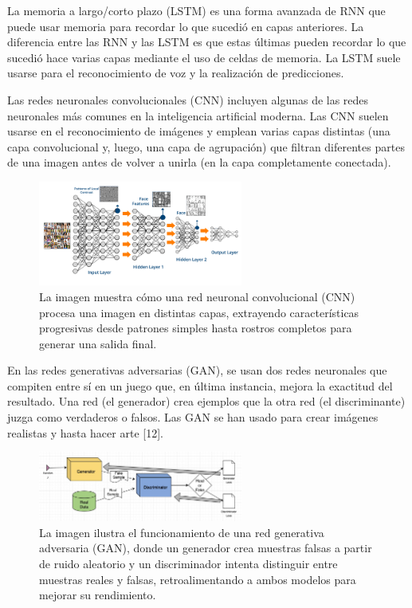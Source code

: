 La memoria a largo/corto plazo (LSTM) es una forma avanzada de RNN que puede usar memoria para recordar lo que sucedió en capas anteriores. La diferencia entre las RNN y las LSTM es que estas últimas pueden recordar lo que sucedió hace varias capas mediante el uso de celdas de memoria. La LSTM suele usarse para el reconocimiento de voz y la realización de predicciones.

Las redes neuronales convolucionales (CNN) incluyen algunas de las redes neuronales más comunes en la inteligencia artificial moderna. Las CNN suelen usarse en el reconocimiento de imágenes y emplean varias capas distintas (una capa convolucional y, luego, una capa de agrupación) que filtran diferentes partes de una imagen antes de volver a unirla (en la capa completamente conectada).
\begin{figure}[H]
  \centering
  \includegraphics[width=0.6\textwidth]{imagenes_doc/redes_convolucionales.png}
  \caption{La imagen muestra cómo una red neuronal convolucional (CNN) procesa una imagen en distintas capas, extrayendo características progresivas desde patrones simples hasta rostros completos para generar una salida final.}
  \label{fig:logo}
\end{figure}

En las redes generativas adversarias (GAN), se usan dos redes neuronales que compiten entre sí en un juego que, en última instancia, mejora la exactitud del resultado. Una red (el generador) crea ejemplos que la otra red (el discriminante) juzga como verdaderos o falsos. Las GAN se han usado para crear imágenes realistas y hasta hacer arte [12].

\begin{figure}[H]
  \centering
  \includegraphics[width=0.6\textwidth]{imagenes_doc/Redes_GAN.jpg}
  \caption{La imagen ilustra el funcionamiento de una red generativa adversaria (GAN), donde un generador crea muestras falsas a partir de ruido aleatorio y un discriminador intenta distinguir entre muestras reales y falsas, retroalimentando a ambos modelos para mejorar su rendimiento.}
  \label{fig:logo}
\end{figure}



